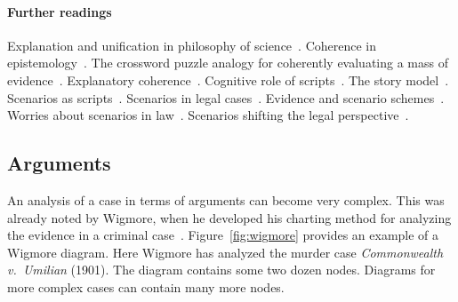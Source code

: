\documentclass[10pt]{article}
\begin{document}
%
%



\paragraph{Further readings}

Explanation and unification 
in philosophy of science~\citep{friedman1974}. 
Coherence in epistemology~\citep{bonjour1985}.
The crossword puzzle analogy for coherently 
evaluating a mass of evidence~\citep{haack2008}.
Explanatory coherence~\citep{thagard2001}.
Cognitive role of scripts~\citep{schankAbelson1977}.
The story model~\citep{penningtonHastie1993StoryModel}. 
Scenarios as scripts~\citep{wagenaarEtal1993}.
Scenarios in legal cases~\citep{griffin2013}. 
Evidence and scenario schemes~\citep{bex2011,verheijEtal2016,vlekEtal2016}.
Worries about scenarios in law~\citep{velleman2003}.
Scenarios shifting the legal perspective~\citep{bexVerheij2013}.





\subsection{Arguments}
\label{sec:coh-arg}

An analysis of a case in terms of arguments can become very complex. This was already noted by Wigmore, when he developed his charting method for analyzing the evidence in a criminal case~\citep{wigmore1913}. Figure~\ref{fig:wigmore} provides an example of a Wigmore diagram. 
Here Wigmore has analyzed the murder case \textit{Commonwealth v.\ Umilian} (1901). 
 The diagram contains some two dozen nodes. Diagrams for more complex cases can contain many more nodes.
\end{document}
